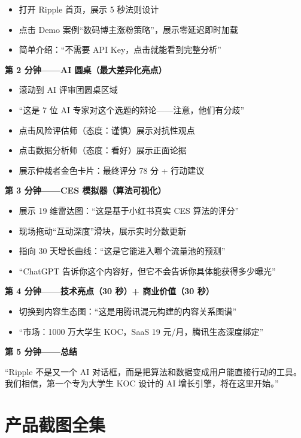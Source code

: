 \documentclass[12pt,a4paper]{ctexart}
\begin{document}
\begin{itemize}
  \item 打开 Ripple 首页，展示 5 秒法则设计
  \item 点击 Demo 案例``数码博主涨粉策略''，展示零延迟即时加载
  \item 简单介绍：``不需要 API Key，点击就能看到完整分析''
\end{itemize}

\textbf{第 2 分钟——AI 圆桌（最大差异化亮点）}

\begin{itemize}
  \item 滚动到 AI 评审团圆桌区域
  \item ``这是 7 位 AI 专家对这个选题的辩论——注意，他们有分歧''
  \item 点击风险评估师（态度：谨慎）展示对抗性观点
  \item 点击数据分析师（态度：看好）展示正面论据
  \item 展示仲裁者金色卡片：最终评分 78 分 + 行动建议
\end{itemize}

\textbf{第 3 分钟——CES 模拟器（算法可视化）}

\begin{itemize}
  \item 展示 19 维雷达图：``这是基于小红书真实 CES 算法的评分''
  \item 现场拖动``互动深度''滑块，展示实时分数更新
  \item 指向 30 天增长曲线：``这是它能进入哪个流量池的预测''
  \item ``ChatGPT 告诉你这个内容好，但它不会告诉你具体能获得多少曝光''
\end{itemize}

\textbf{第 4 分钟——技术亮点（30 秒）+ 商业价值（30 秒）}

\begin{itemize}
  \item 切换到内容生态图：``这是用腾讯混元构建的内容关系图谱''
  \item ``市场：1000 万大学生 KOC，SaaS 19 元/月，腾讯生态深度绑定''
\end{itemize}

\textbf{第 5 分钟——总结}

``Ripple 不是又一个 AI 对话框，而是把算法和数据变成用户能直接行动的工具。
我们相信，第一个专为大学生 KOC 设计的 AI 增长引擎，将在这里开始。''


\section{产品截图全集}
\end{document}
